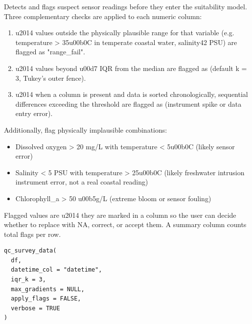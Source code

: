 \documentclass[a4paper]{book}
\begin{document}
\begin{Description}
Detects and flags suspect sensor readings before they enter the suitability
model. Three complementary checks are applied to each numeric column:
\begin{enumerate}

\item{}  \bsl{}u2014 values outside the physically plausible range for that
variable (e.g. temperature > 35\bsl{}u00b0C in temperate coastal water, salinity42 PSU) are flagged as "range\_fail".
\item{}  \bsl{}u2014 values beyond  \bsl{}u00d7 IQR from the median
are flagged as  (default k = 3, Tukey's outer fence).
\item{}  \bsl{}u2014 when a  column is present and data is
sorted chronologically, sequential differences exceeding the
 threshold are flagged as  (instrument
spike or data entry error).

\end{enumerate}


Additionally,  flag physically implausible
combinations:
\begin{itemize}

\item{} Dissolved oxygen > 20 mg/L with temperature < 5\bsl{}u00b0C (likely sensor error)
\item{} Salinity < 5 PSU with temperature > 25\bsl{}u00b0C (likely freshwater intrusion
instrument error, not a real coastal reading)
\item{} Chlorophyll\_a > 50 \bsl{}u00b5g/L (extreme bloom or sensor fouling)

\end{itemize}


Flagged values are  \bsl{}u2014 they are marked in a 
column so the user can decide whether to replace with NA, correct, or
accept them. A summary  column counts total flags per row.
\end{Description}
%
\begin{Usage}
\begin{verbatim}
qc_survey_data(
  df,
  datetime_col = "datetime",
  iqr_k = 3,
  max_gradients = NULL,
  apply_flags = FALSE,
  verbose = TRUE
)
\end{verbatim}
\end{Usage}
\end{document}
